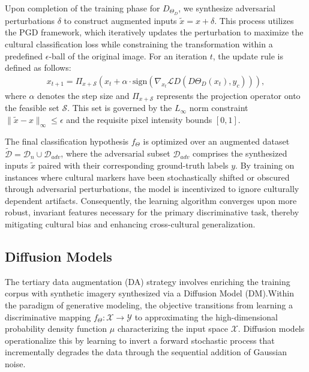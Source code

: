 Upon completion of the training phase for $D_{\Theta_D}$, we synthesize adversarial perturbations $\delta$ to construct augmented inputs $\tilde{x} = x + \delta$. 
This process utilizes the PGD framework, which iteratively updates the perturbation to maximize the cultural classification loss while constraining the transformation within a predefined $\epsilon$-ball of the original image. For an iteration $t$, the update rule is defined as follows:
%
\begin{align}
x_{t+1} = \Pi_{x+\mathcal{S}} \left( x_t + \alpha \cdot \text{sign} \left( \nabla_{x_t} \mathcal{L}D(D{\Theta_D}(x_t), y_{c}) \right) \right),
\end{align}
%
where $\alpha$ denotes the step size and $\Pi_{x+\mathcal{S}}$ represents the projection operator onto the feasible set $\mathcal{S}$. 
This set is governed by the $L_\infty$ norm constraint $\| \tilde{x} - x \|_\infty \leq \epsilon$ and the requisite pixel intensity bounds $[0, 1]$.

The final classification hypothesis $f_{\Theta}$ is optimized over an augmented dataset $\tilde{\mathcal{D}} = \mathcal{D}_n \cup \mathcal{D}_{adv}$, where the adversarial subset $\mathcal{D}_{adv}$ comprises the synthesized inputs $\tilde{x}$ paired with their corresponding ground-truth labels $y$. 
By training on instances where cultural markers have been stochastically shifted or obscured through adversarial perturbations, the model is incentivized to ignore culturally dependent artifacts. Consequently, the learning algorithm converges upon more robust, invariant features necessary for the primary discriminative task, thereby mitigating cultural bias and enhancing cross-cultural generalization.

\subsection{Diffusion Models}
\label{ch2:sec:diff_model}
The tertiary data augmentation (DA) strategy involves enriching the training corpus with synthetic imagery synthesized via a Diffusion Model (DM).Within the paradigm of generative modeling, the objective transitions from learning a discriminative mapping $f_\Theta: \mathcal{X} \rightarrow \mathcal{Y}$ to approximating the high-dimensional probability density function $\mu$ characterizing the input space $\mathcal{X}$. 
Diffusion models operationalize this by learning to invert a forward stochastic process that incrementally degrades the data through the sequential addition of Gaussian noise.

